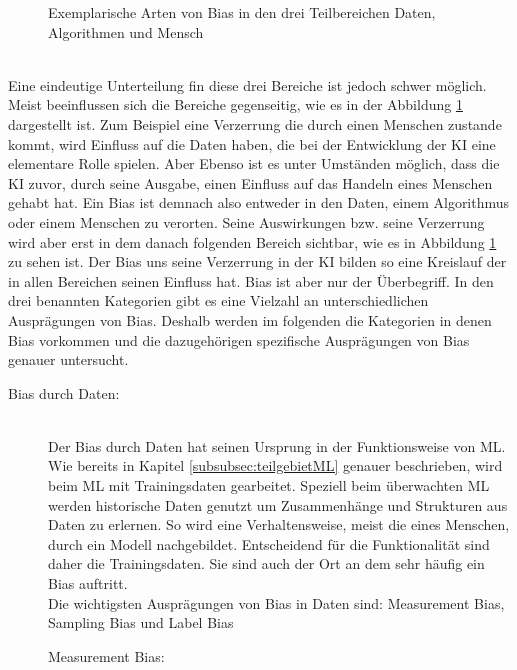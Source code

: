 \begin{onehalfspace}
\begin{figure}[h]
            \caption{Exemplarische Arten von Bias in den drei Teilbereichen Daten, Algorithmen und Mensch \cite{Mehrabi2021}}
            \label{fig:BiasCycle}
        \end{figure}\\
        Eine eindeutige Unterteilung fin diese drei Bereiche ist jedoch schwer möglich. Meist beeinflussen sich die Bereiche gegenseitig, wie es in der Abbildung \ref*{fig:BiasCycle} dargestellt ist. Zum Beispiel eine Verzerrung die durch einen Menschen zustande kommt, wird Einfluss auf die Daten haben, die bei der Entwicklung der \ac{KI} eine elementare Rolle spielen. Aber Ebenso ist es unter Umständen möglich, dass die \ac{KI} zuvor, durch seine Ausgabe, einen Einfluss auf das Handeln eines Menschen gehabt hat.\cite{Mehrabi2021} Ein Bias ist demnach also entweder in den Daten, einem Algorithmus oder einem Menschen zu verorten. Seine Auswirkungen bzw. seine Verzerrung wird aber erst in dem danach folgenden Bereich sichtbar, wie es in Abbildung \ref*{fig:BiasCycle} zu sehen ist. Der Bias uns seine Verzerrung in der \ac*{KI} bilden so eine Kreislauf der in allen Bereichen seinen Einfluss hat.\cite*[]{Mehrabi2021}
        Bias ist aber nur der Überbegriff. In den drei benannten Kategorien gibt es eine Vielzahl an unterschiedlichen Ausprägungen von Bias. Deshalb werden im folgenden die Kategorien in denen Bias vorkommen und die dazugehörigen spezifische Ausprägungen von Bias genauer untersucht.
        \begin{description}
            \item [Bias durch Daten:]\hfill \\
            Der Bias durch Daten hat seinen Ursprung in der Funktionsweise von \ac{ML}. Wie bereits in Kapitel \ref{subsubsec:teilgebietML} genauer beschrieben, wird beim \ac{ML} mit Trainingsdaten gearbeitet. Speziell beim überwachten \ac*{ML} werden historische Daten genutzt um Zusammenhänge und Strukturen aus Daten zu erlernen. So wird eine Verhaltensweise, meist die eines Menschen, durch ein Modell nachgebildet. Entscheidend für die Funktionalität sind daher die Trainingsdaten. Sie sind auch der Ort an dem sehr häufig ein Bias auftritt.\cite{silberg2019notes}\cite{Drew2019}
            \\
            Die wichtigsten Ausprägungen von Bias in Daten sind: Measurement Bias, Sampling Bias und Label Bias\cite{srinivasan2021biases}\cite{Mehrabi2021}
            \begin{description}
                \item [Measurement Bias:] \hfill \\

\end{description}
\end{description}
\end{onehalfspace}
